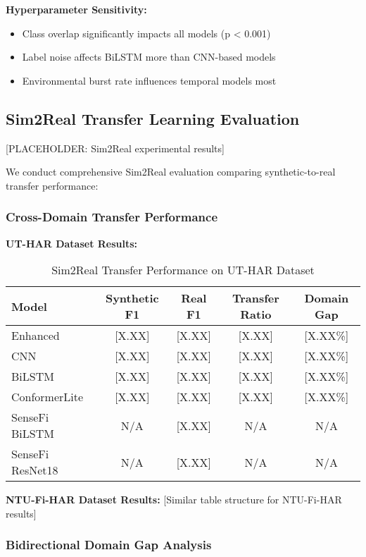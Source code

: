 \documentclass[journal]{IEEEtran}
\begin{document}
\textbf{Hyperparameter Sensitivity:}
\begin{itemize}
\item Class overlap significantly impacts all models (p < 0.001)
\item Label noise affects BiLSTM more than CNN-based models
\item Environmental burst rate influences temporal models most
\end{itemize}

\subsection{Sim2Real Transfer Learning Evaluation}

[PLACEHOLDER: Sim2Real experimental results]

We conduct comprehensive Sim2Real evaluation comparing synthetic-to-real transfer performance:

\subsubsection{Cross-Domain Transfer Performance}

\textbf{UT-HAR Dataset Results:}
\begin{table}[ht]
\centering
\caption{Sim2Real Transfer Performance on UT-HAR Dataset}
\begin{tabular}{@{}lcccc@{}}
\toprule
Model & Synthetic F1 & Real F1 & Transfer Ratio & Domain Gap \\
\midrule
Enhanced & [X.XX] & [X.XX] & [X.XX] & [X.XX\%] \\
CNN & [X.XX] & [X.XX] & [X.XX] & [X.XX\%] \\
BiLSTM & [X.XX] & [X.XX] & [X.XX] & [X.XX\%] \\
ConformerLite & [X.XX] & [X.XX] & [X.XX] & [X.XX\%] \\
\midrule
SenseFi BiLSTM & N/A & [X.XX] & N/A & N/A \\
SenseFi ResNet18 & N/A & [X.XX] & N/A & N/A \\
\bottomrule
\end{tabular}
\end{table}

\textbf{NTU-Fi-HAR Dataset Results:}
[Similar table structure for NTU-Fi-HAR results]

\subsubsection{Bidirectional Domain Gap Analysis}
\end{document}
